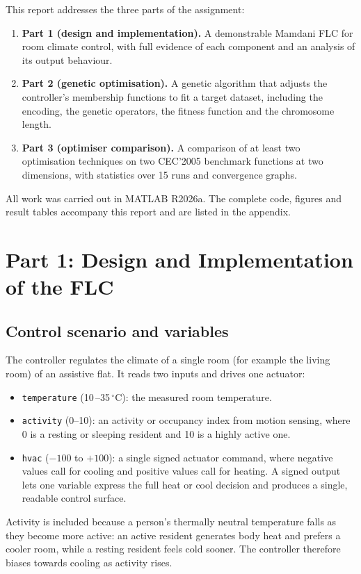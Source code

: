\documentclass[11pt,a4paper]{article}
\newcommand{\celsius}{\ensuremath{^\circ}C}
\newcommand{\SI}[2]{#1\,#2}
\begin{document}
This report addresses the three parts of the assignment:
\begin{enumerate}
  \item \textbf{Part 1 (design and implementation).} A demonstrable Mamdani FLC for room climate
        control, with full evidence of each component and an analysis of its output behaviour.
  \item \textbf{Part 2 (genetic optimisation).} A genetic algorithm that adjusts the controller's
        membership functions to fit a target dataset, including the encoding, the genetic operators,
        the fitness function and the chromosome length.
  \item \textbf{Part 3 (optimiser comparison).} A comparison of at least two optimisation techniques
        on two CEC'2005 benchmark functions at two dimensions, with statistics over 15 runs and
        convergence graphs.
\end{enumerate}
All work was carried out in MATLAB R2026a. The complete code, figures and result tables accompany this
report and are listed in the appendix.

\section{Part 1: Design and Implementation of the FLC}

\subsection{Control scenario and variables}
The controller regulates the climate of a single room (for example the living room) of an assistive
flat. It reads two inputs and drives one actuator:
\begin{itemize}
  \item \texttt{temperature} (\SI{10}{}--\SI{35}{\celsius}): the measured room temperature.
  \item \texttt{activity} (0--10): an activity or occupancy index from motion sensing, where 0 is a
        resting or sleeping resident and 10 is a highly active one.
  \item \texttt{hvac} ($-100$ to $+100$): a single signed actuator command, where negative values call
        for cooling and positive values call for heating. A signed output lets one variable express the
        full heat or cool decision and produces a single, readable control surface.
\end{itemize}
Activity is included because a person's thermally neutral temperature falls as they become more active:
an active resident generates body heat and prefers a cooler room, while a resting resident feels cold
sooner. The controller therefore biases towards cooling as activity rises.
\end{document}
